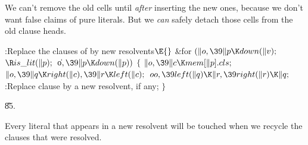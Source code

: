 We can't remove the old cells until {\it after\/}
inserting the new ones, because we don't want false claims of
pure literals. But we {\it can\/} safely detach those cells from
the old clause heads.

\Y\B\4:Replace the clauses of  by new resolvents\X${}\E{}$\6
\&{for} ${}(\|o,\39\|p\K\\{down}(\|v);{}$ ${}\R\\{is\_lit}(\|p);{}$ \|o${},\39%
\|p\K\\{down}(\|p)){}$\5
${}\{{}$\1\6
${}\|o,\39\|c\K\\{mem}[\|p].\\{cls};{}$\6
${}\|o,\39\|q\K\\{right}(\|c),\39\|r\K\\{left}(\|c);{}$\6
${}\\{oo},\39\\{left}(\|q)\K\|r,\39\\{right}(\|r)\K\|q;{}$\6
:Replace clause  by a new resolvent, if any\X;\6
\4${}\}{}$\2\par
\U85.\fi

Every literal that appears in a new resolvent will be
touched
when we recycle the clauses that were resolved.

